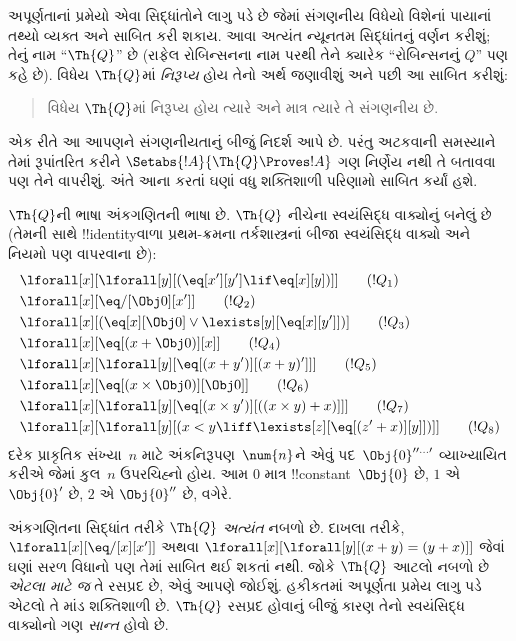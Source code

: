 \documentclass[../../../include/open-logic-section]{subfiles}
\begin{document}

અપૂર્ણતાનાં પ્રમેયો એવા સિદ્ધાંતોને લાગુ
પડે છે જેમાં સંગણનીય વિધેયો વિશેનાં
પાયાનાં તથ્યો વ્યક્ત અને સાબિત કરી
શકાય. આવા અત્યંત ન્યૂનતમ સિદ્ધાંતનું
વર્ણન કરીશું; તેનું નામ
``$\Th{Q}$'' છે (રાફેલ રોબિન્સનના
નામ પરથી તેને ક્યારેક
``રોબિન્સનનું $Q$'' પણ કહે છે).
વિધેય $\Th{Q}$માં \emph{નિરૂપ્ય}
હોય તેનો અર્થ જણાવીશું અને પછી આ
સાબિત કરીશું:
\begin{quote}
  વિધેય $\Th{Q}$માં નિરૂપ્ય હોય
  ત્યારે અને માત્ર ત્યારે તે સંગણનીય છે.
\end{quote}
એક રીતે આ આપણને સંગણનીયતાનું બીજું
નિદર્શ આપે છે. પરંતુ અટકવાની
સમસ્યાને તેમાં રૂપાંતરિત કરીને
$\Setabs{!A}{\Th{Q} \Proves !A}$
ગણ નિર્ણેય નથી તે બતાવવા પણ તેને
વાપરીશું. અંતે આના કરતાં ઘણાં વધુ
શક્તિશાળી પરિણામો સાબિત કર્યાં હશે.

$\Th{Q}$ની ભાષા અંકગણિતની ભાષા છે.
$\Th{Q}$ નીચેના સ્વયંસિદ્ધ વાક્યોનું
બનેલું છે (તેમની સાથે
!!{identity}વાળા પ્રથમ-ક્રમના
તર્કશાસ્ત્રનાં બીજા સ્વયંસિદ્ધ વાક્યો
અને નિયમો પણ વાપરવાના છે):
\begin{align*}
& \lforall[x][\lforall[y][(\eq[x'][y'] \lif \eq[x][y])]] \tag{$!Q_1$}\\
& \lforall[x][\eq/[\Obj 0][x']] \tag{$!Q_2$}\\
& \lforall[x][(\eq[x][\Obj 0] \lor \lexists[y][\eq[x][y']])] \tag{$!Q_3$}\\
& \lforall[x][\eq[(x + \Obj 0)][x]] \tag{$!Q_4$}\\
& \lforall[x][\lforall[y][\eq[(x + y')][(x + y)']]] \tag{$!Q_5$}\\
& \lforall[x][\eq[(x \times \Obj 0)][\Obj 0]] \tag{$!Q_6$}\\
& \lforall[x][\lforall[y][\eq[(x \times y')][((x \times y) + x)]]] \tag{$!Q_7$}\\
& \lforall[x][\lforall[y][(x < y \liff \lexists[z][\eq[(z' + x)][y]])]] \tag{$!Q_8$}
\end{align*}
દરેક પ્રાકૃતિક સંખ્યા~$n$ માટે
અંકનિરૂપણ~$\num{n}$ને એવું
પદ~$\Obj{0}^{\prime\prime\ldots\prime}$
વ્યાખ્યાયિત કરીએ જેમાં કુલ~$n$
ઉપરચિહ્નો હોય. આમ $\num{0}$
માત્ર !!{constant}~$\Obj{0}$ છે,
$\num{1}$ એ $\Obj{0}'$ છે,
$\num{2}$ એ $\Obj{0}''$ છે, વગેરે.

અંકગણિતના સિદ્ધાંત તરીકે
$\Th{Q}$ \emph{અત્યંત} નબળો છે.
દાખલા તરીકે,
$\lforall[x][\eq/[x][x']]$ અથવા
$\lforall[x][\lforall[y][(x + y) = (y +
    x)]]$ જેવાં ઘણાં સરળ વિધાનો પણ
તેમાં સાબિત થઈ શકતાં નથી. જોકે
$\Th{Q}$ આટલો નબળો છે \emph{એટલા
માટે જ} તે રસપ્રદ છે, એવું આપણે
જોઈશું. હકીકતમાં અપૂર્ણતા પ્રમેય
લાગુ પડે એટલો તે માંડ શક્તિશાળી છે.
$\Th{Q}$ રસપ્રદ હોવાનું બીજું કારણ
તેનો સ્વયંસિદ્ધ વાક્યોનો ગણ
\emph{સાન્ત} હોવો છે.
\end{document}
